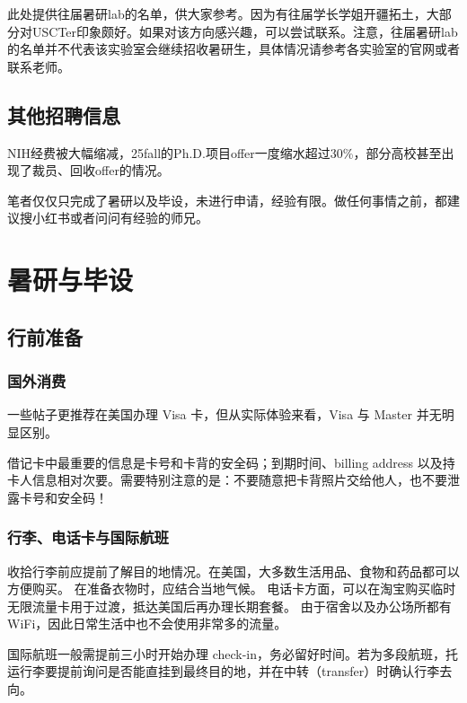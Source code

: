 \begin{remark}
    此处提供往届暑研lab的名单，供大家参考。因为有往届学长学姐开疆拓土，大部分对USCTer印象颇好。如果对该方向感兴趣，可以尝试联系。注意，往届暑研lab的名单并不代表该实验室会继续招收暑研生，具体情况请参考各实验室的官网或者联系老师。
\end{remark}


\subsection*{其他招聘信息}

\begin{notebox}[写在前面]

    NIH经费被大幅缩减，25fall的Ph.D.项目offer一度缩水超过30\%，部分高校甚至出现了裁员、回收offer的情况。
\end{notebox}

笔者仅仅只完成了暑研以及毕设，未进行申请，经验有限。做任何事情之前，都建议搜小红书或者问问有经验的师兄。

\section{暑研与毕设}

\subsection{行前准备}

\subsubsection*{国外消费}
一些帖子更推荐在美国办理 Visa 卡，但从实际体验来看，Visa 与 Master 并无明显区别。

借记卡中最重要的信息是卡号和卡背的安全码；到期时间、billing address 以及持卡人信息相对次要。需要特别注意的是：不要随意把卡背照片交给他人，也不要泄露卡号和安全码！

\subsubsection*{行李、电话卡与国际航班}

收拾行李前应提前了解目的地情况。在美国，大多数生活用品、食物和药品都可以方便购买。  
在准备衣物时，应结合当地气候。
电话卡方面，可以在淘宝购买临时无限流量卡用于过渡，抵达美国后再办理长期套餐。
由于宿舍以及办公场所都有WiFi，因此日常生活中也不会使用非常多的流量。

国际航班一般需提前三小时开始办理 check-in，务必留好时间。若为多段航班，托运行李要提前询问是否能直挂到最终目的地，并在中转（transfer）时确认行李去向。



